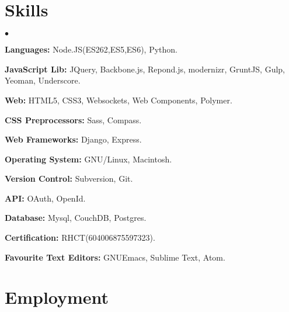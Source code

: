 \documentclass[margin, line, 10pt]{res}
\newenvironment{list2}{
  \begin{list}{$\bullet$}{%
      \setlength{\itemsep}{0in}
      \setlength{\parsep}{0in} \setlength{\parskip}{0in}
      \setlength{\topsep}{0in} \setlength{\partopsep}{0in}
      \setlength{\leftmargin}{0.2in}}}{\end{list}}
\begin{document}
\begin{resume}
\section{Skills}
\begin{list2}
\item {\bf Languages:} Node.JS(ES262,ES5,ES6), Python.\\
\vspace{-.3cm}
\item {\bf JavaScript Lib:} JQuery, Backbone.js, Repond.js, modernizr, GruntJS, Gulp, Yeoman, Underscore.\\
\vspace{-.3cm}
\item {\bf Web:} HTML5, CSS3, Websockets, Web Components, Polymer.\\
\vspace{-.3cm}
\item {\bf CSS Preprocessors:} Sass, Compass.\\
\vspace{-.3cm}
\item {\bf Web Frameworks:} Django, Express.\\
\vspace{-.3cm}
\item {\bf Operating System:} GNU/Linux, Macintosh.\\
\vspace{-.3cm}
\item {\bf Version Control:} Subversion, Git.\\
\vspace{-.3cm}
\item {\bf API:} OAuth, OpenId.\\
\vspace{-.3cm}
\item {\bf Database:} Mysql, CouchDB, Postgres.\\
\vspace{-.3cm}
\item {\bf Certification:} RHCT(604006875597323).\\
\vspace{-.3cm}
\item {\bf Favourite Text Editors:} GNUEmacs, Sublime Text, Atom.\\
\vspace{-.3cm}
\end{list2}

\section{Employment}


\end{resume}
\end{document}
